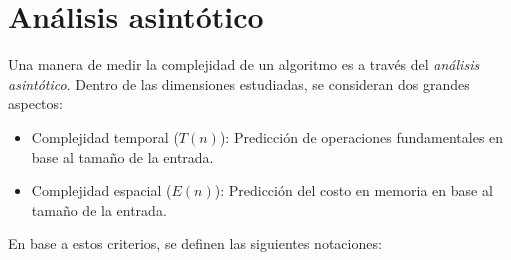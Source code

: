 \section{Análisis asintótico}
Una manera de medir la complejidad de un algoritmo es a través
del \textit{análisis asintótico}. Dentro de las dimensiones
estudiadas, se consideran dos grandes aspectos:

\begin{itemize}
  \item{Complejidad temporal ($T(n)$): Predicción de operaciones
        fundamentales en base al tamaño de la entrada.}
  \item{Complejidad espacial ($E(n)$): Predicción del costo en
        memoria en base al tamaño de la entrada.}
\end{itemize}

En base a estos criterios, se definen las siguientes notaciones:





